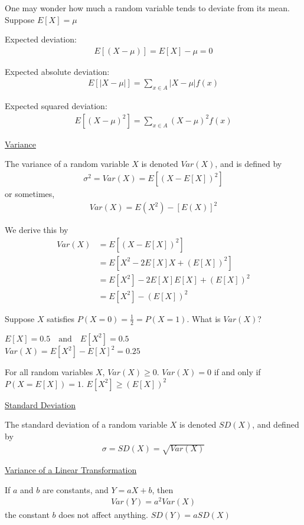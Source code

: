 \documentclass{article}
\begin{document}
One may wonder how much a random variable tends to deviate from its mean. Suppose $E[X] = \mu$

Expected deviation:
\begin{align*}
    E[(X - \mu)] = E[X] - \mu = 0
\end{align*}

Expected absolute deviation:
\begin{align*}
    E[|X - \mu|] = \sum_{x \in A}|X - \mu|f(x)
\end{align*}

Expected squared deviation:
\begin{align*}
    E[(X-\mu)^2] = \sum_{x \in A}(X-\mu)^2f(x)
\end{align*}

\underline{Variance}

The variance of a random variable $X$ is denoted $Var(X)$, and is defined by
\begin{align*}
    \sigma^2 = Var(X) = E[(X - E[X])^2]
\end{align*}
or sometimes,
\begin{align*}
    Var(X) = E(X^2) - [E(X)]^2
\end{align*}

We derive this by
\begin{align*}
    Var(X) &= E[(X - E[X])^2] \\
    &= E[X^2 - 2E[X]X+(E[X])^2] \\
    &= E[X^2] - 2E[X]E[X] + (E[X])^2 \\
    &= E[X^2] - (E[X])^2
\end{align*}

Suppose $X$ satisfies $P(X=0) = \frac{1}{2} = P(X=1)$. What is $Var(X)$?

$E[X] = 0.5 \quad \text{and} \quad E[X^2] = 0.5$\\
$Var(X) = E[X^2] - E[X]^2 = 0.25$

For all random variables $X$, $Var(X) \ge 0$. $Var(X) = 0$ if and only if $P(X = E[X]) = 1$. $E[X^2] \ge (E[X])^2$

\underline{Standard Deviation}

The standard deviation of a random variable $X$ is denoted $SD(X)$, and defined by
\begin{align*}
    \sigma = SD(X) = \sqrt{Var(X)}
\end{align*}

\underline{Variance of a Linear Transformation}

If $a$ and $b$ are constants, and $Y = aX + b$, then
\begin{align*}
    Var(Y) = a^2Var(X)
\end{align*}
the constant $b$ does not affect anything. $SD(Y) = aSD(X)$
\end{document}
